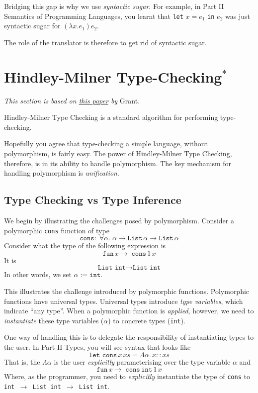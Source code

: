 {Bridging this gap is why we use \textit{syntactic sugar}. For example, in \textsf{Part II Semantics of Programming Languages}, you learnt that \texttt{let} $x = e_1$ \texttt{in} $e_2$ was just syntactic sugar for $(\lambda x. e_1) e_2$.

The role of the translator is therefore to get rid of syntactic sugar. 

\section{Hindley-Milner Type-Checking$^*$}\label{section:hm-type-checking}
\textit{This section is based on \href{https://steshaw.org/hm/hindley-milner.pdf}{this paper} by} Grant.

Hindley-Milner Type Checking is a standard algorithm for performing type-checking. 

Hopefully you agree that type-checking a simple language, without polymorphism, is fairly easy. The power of Hindley-Milner Type Checking, therefore, is in its ability to handle polymorphism. The key mechanism for handling polymorphism is \textit{unification}.

\subsection{Type Checking vs Type Inference}
We begin by illustrating the challenges posed by polymorphism. Consider a polymorphic \texttt{cons} function of type
\[\texttt{cons}: \; \forall \alpha. \; \alpha \to \texttt{List} \, \alpha \to \texttt{List} \, \alpha\]
Consider what the type of the following expression is
\[\texttt{fun} \, x \rightarrow \; \texttt{cons} \, 1 \, x \]
It is
\[\texttt{List int} \rightarrow \texttt{List int}\]
In other words, we set $\alpha := \texttt{int}$.

This illustrates the challenge introduced by polymorphic functions. Polymorphic functions have universal types. Universal types introduce \textit{type variables}, which indicate ``any type''. When a polymorphic function is \textit{applied}, however, we need to \textit{instantiate} these type variables ($\alpha$) to concrete types (\texttt{int}). 

One way of handling this is to delegate the responsibility of instantiating types to the user. In \textsf{Part II Types}, you will see syntax that looks like
\[\texttt{let cons} \, x \, xs = \Lambda \alpha . \, x :: xs \]
That is, the $\Lambda \alpha$ is the user \textit{explicitly} parameterising over the type variable $\alpha$
and
\[\texttt{fun} \, x \rightarrow \; \texttt{cons} \, \texttt{int} \, 1 \, x \]
Where, as the programmer, you need to \textit{explicitly} instantiate the type of \texttt{cons} to \texttt{int $\rightarrow$ List int $\rightarrow$ List int}. 

}
